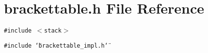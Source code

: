 \section{brackettable.h File Reference}
\label{brackettable_8h}
{\tt \#include $<$stack$>$}\par
{\tt \#include \char`\"{}brackettable\_\-impl.h\char`\"{}}\par
